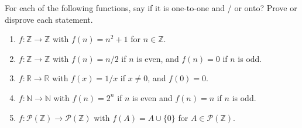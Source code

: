 \documentclass{article}
\newcommand{\Z}{\mathbb{Z}}
\newcommand{\N}{\mathbb{N}}
\newcommand{\R}{\mathbb{R}}
\theoremstyle{definition}
\begin{document}
\begin{question}
    For each of the following functions, say if it is one-to-one and / or onto? Prove or disprove each statement.
    \begin{enumerate}
	\item $f : \Z \to \Z$ with $f(n) = n^2 + 1$ for $n \in \Z$.
	\item $f : \Z \to \Z$ with $f(n) = n/2$ if $n$ is even, and $f(n) = 0$ if $n$ is odd.
	\item $f : \R \to \R$ with $f(x) = 1/x$ if $x \neq 0$, and $f(0) = 0$.
	\item $f: \N \to \N$ with $f(n) = 2^n$ if $n$ is even and $f(n) = n$ if $n$ is odd.
	\item $f : \mathcal{P}(\Z) \to \mathcal{P}(\Z)$ with $f(A) = A \cup \{ 0 \}$ for $A \in \mathcal{P}(\Z)$.
    \end{enumerate}
\end{question}
\end{document}
